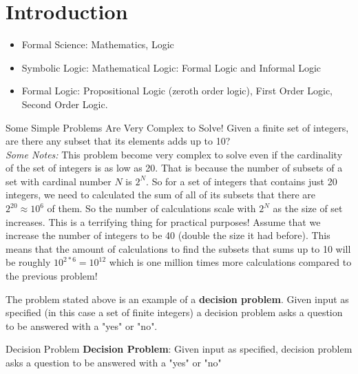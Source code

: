 \section{Introduction}

\begin{itemize}
	\item Formal Science: Mathematics, Logic
	\item Symbolic Logic: Mathematical Logic: Formal Logic and Informal Logic 
	\item Formal Logic: Propositional Logic (zeroth order logic), First Order Logic, Second Order Logic.
	
\end{itemize}



\begin{example}{Some Simple Problems Are Very Complex to Solve!}
	Given a finite set of integers, are there any subset that its elements adds up to 10? \\
	
	\emph{Some Notes: }This problem become very complex to solve even if the cardinality of the set of integers is as low as 20. That is because the number of subsets of a set with cardinal number $N$ is $2^N$. So for a set of integers that contains just 20 integers, we need to calculated the sum of all of its subsets that there are $ 2^{20} \approx 10^6$ of them. So the number of calculations scale with $2^N$ as the size of set increases. This is a terrifying thing for practical purposes! Assume that we increase the number of integers to be 40 (double the size it had before). This means that the amount of calculations to find the subsets that sums up to 10 will be roughly $ 10^{2*6} = 10^{12} $ which is one million times more calculations compared to the previous problem!
\end{example}


The problem stated above is an example of a \textbf{decision problem}. Given input as specified (in this case a set of finite integers) a decision problem asks a question to be answered with a "yes" or "no".

\begin{defbox}{Decision Problem}
	\textbf{Decision Problem}: Given input as specified, decision problem asks a question to be answered with a "yes" or "no"
	
\end{defbox}